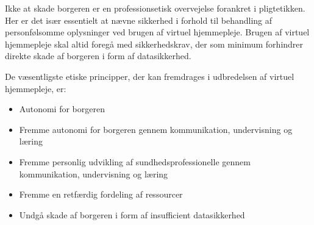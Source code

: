 Ikke at skade borgeren er en professionsetisk overvejelse forankret i pligtetikken. Her er det især essentielt at nævne sikkerhed i forhold til behandling af personfølsomme oplysninger ved brugen af virtuel hjemmepleje. Brugen af virtuel hjemmepleje skal altid foregå med sikkerhedskrav, der som minimum forhindrer direkte skade af borgeren i form af datasikkerhed.

De væsentligste etiske principper, der kan fremdrages i udbredelsen af virtuel hjemmepleje, er:

\begin{itemize}
	\item Autonomi for borgeren
	\item Fremme autonomi for borgeren gennem kommunikation, undervisning og læring
	\item Fremme personlig udvikling af sundhedsprofessionelle gennem kommunikation, undervisning og læring
	\item Fremme en retfærdig fordeling af ressourcer 
	\item Undgå skade af borgeren i form af insufficient datasikkerhed
\end{itemize}





